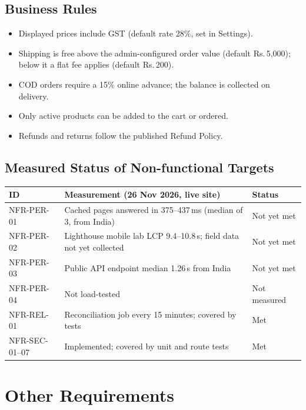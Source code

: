 \documentclass[11pt,a4paper]{article}
\newcommand{\newsection}[1]{\clearpage\section{#1}}
\newcommand{\rupee}{Rs.\,}
\begin{document}
\subsection{Business Rules}
\begin{itemize}
  \item Displayed prices include GST (default rate 28\%, set in Settings).
  \item Shipping is free above the admin-configured order value (default \rupee5,000);
        below it a flat fee applies (default \rupee200).
  \item COD orders require a 15\% online advance; the balance is collected on delivery.
  \item Only active products can be added to the cart or ordered.
  \item Refunds and returns follow the published Refund Policy.
\end{itemize}

\subsection{Measured Status of Non-functional Targets}\label{sec:nfrstatus}
\begin{tabularx}{\linewidth}{@{}l X l@{}}
\toprule
\textbf{ID} & \textbf{Measurement (26 Nov 2026, live site)} & \textbf{Status} \\
\midrule
NFR-PER-01 & Cached pages answered in 375--437\,ms (median of 3, from India) & Not yet met \\
NFR-PER-02 & Lighthouse mobile lab LCP 9.4--10.8\,s; field data not yet collected & Not yet met \\
NFR-PER-03 & Public API endpoint median 1.26\,s from India & Not yet met \\
NFR-PER-04 & Not load-tested & Not measured \\
NFR-REL-01 & Reconciliation job every 15 minutes; covered by tests & Met \\
NFR-SEC-01--07 & Implemented; covered by unit and route tests & Met \\
\bottomrule
\end{tabularx}

\newsection{Other Requirements}
\end{document}

